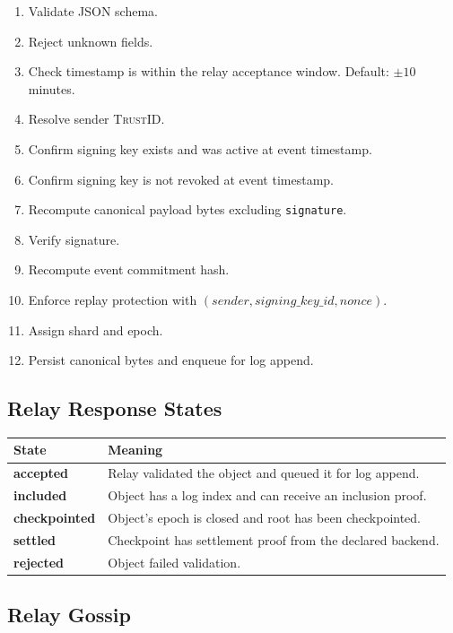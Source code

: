 \documentclass[11pt]{article}
\newcommand{\TrustID}{\textsc{TrustID}}
\begin{document}
\begin{enumerate}
    \item Validate JSON schema.
    \item Reject unknown fields.
    \item Check timestamp is within the relay acceptance window. Default: \(\pm 10\) minutes.
    \item Resolve sender \TrustID{}.
    \item Confirm signing key exists and was active at event timestamp.
    \item Confirm signing key is not revoked at event timestamp.
    \item Recompute canonical payload bytes excluding \texttt{signature}.
    \item Verify signature.
    \item Recompute event commitment hash.
    \item Enforce replay protection with \((sender, signing\_key\_id, nonce)\).
    \item Assign shard and epoch.
    \item Persist canonical bytes and enqueue for log append.
\end{enumerate}

\subsection{Relay Response States}

\begin{center}
\begin{tabularx}{\textwidth}{>{\bfseries}p{} X}
\toprule
State & Meaning \\
\midrule
accepted & Relay validated the object and queued it for log append. \\
included & Object has a log index and can receive an inclusion proof. \\
checkpointed & Object's epoch is closed and root has been checkpointed. \\
settled & Checkpoint has settlement proof from the declared backend. \\
rejected & Object failed validation. \\
\bottomrule
\end{tabularx}
\end{center}

\subsection{Relay Gossip}
\end{document}
